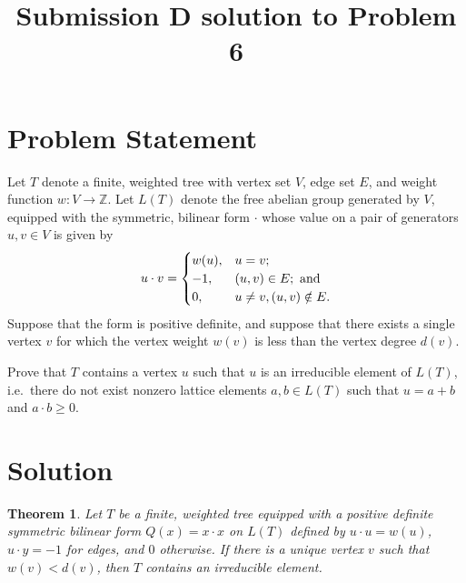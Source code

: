 \documentclass[12pt]{article}
\newcommand{\bZ}{\mathbb{Z}}
\newtheorem{theorem}{Theorem}
\begin{document}
\title{Submission D solution to Problem 6}
\date{}
\maketitle

\section*{Problem Statement}

Let $T$ denote a finite, weighted tree with vertex set $V$, edge set $E$, and weight function $w : V \longrightarrow \bZ$.
Let $L(T)$ denote the free abelian group generated by $V$, equipped with the symmetric, bilinear form $\cdot$ whose value on a pair of generators $u,v \in V$ is given by 
\[
u \cdot v = 
\begin{cases}
    w(u), & u=v; \\
    -1, & (u,v) \in E; \textup{ and} \\
    0, & u \ne v, (u,v) \notin E.
\end{cases}
\]
Suppose that the form is positive definite, and suppose that there exists a single vertex $v$ for which the vertex weight $w(v)$ is less than the vertex degree $d(v)$.

Prove that $T$ contains a vertex $u$ such that $u$ is an irreducible element of $L(T)$, i.e.~there do not exist nonzero lattice elements $a,b \in L(T)$ such that $u = a+b$ and $a \cdot b \ge 0$.

\section*{Solution}

\begin{theorem}
Let $T$ be a finite, weighted tree equipped with a positive definite symmetric bilinear form $Q(x) = x \cdot x$ on $L(T)$ defined by $u \cdot u = w(u)$, $u \cdot y = -1$ for edges, and $0$ otherwise. If there is a unique vertex $v$ such that $w(v) < d(v)$, then $T$ contains an irreducible element.
\end{theorem}
\end{document}
